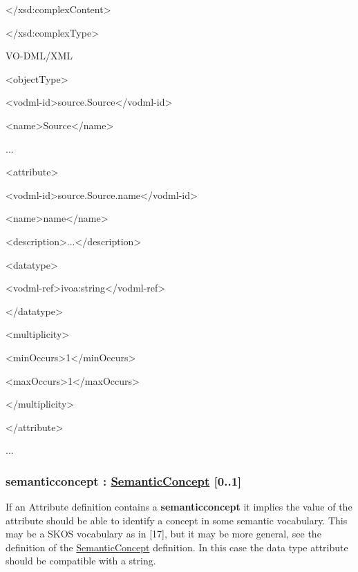 \documentclass[10pt,a4paper]{ivoa}
\begin{document}
\textless/xsd:complexContent\textgreater{}

\textless/xsd:complexType\textgreater{}

VO-DML/XML

\textless objectType\textgreater{}

\textless vodml-id\textgreater source.Source\textless/vodml-id\textgreater{}

\textless name\textgreater Source\textless/name\textgreater{}

...

\textless attribute\textgreater{}

\textless vodml-id\textgreater source.Source.name\textless/vodml-id\textgreater{}

\textless name\textgreater name\textless/name\textgreater{}

\textless description\textgreater...\textless/description\textgreater{}

\textless datatype\textgreater{}

\textless vodml-ref\textgreater ivoa:string\textless/vodml-ref\textgreater{}

\textless/datatype\textgreater{}

\textless multiplicity\textgreater{}

\textless minOccurs\textgreater1\textless/minOccurs\textgreater{}

\textless maxOccurs\textgreater1\textless/maxOccurs\textgreater{}

\textless/multiplicity\textgreater{}

\textless/attribute\textgreater{}

...

\hypertarget{semanticconcept-semanticconcept-0..1}{%
\subsubsection{\texorpdfstring{semanticconcept :
\protect\hyperlink{semanticconcept}{SemanticConcept}
{[}0..1{]}}{semanticconcept : SemanticConcept {[}0..1{]}}}\label{semanticconcept-semanticconcept-0..1}}

If an Attribute definition contains a \textbf{semanticconcept} it
implies the value of the attribute should be able to identify a concept
in some semantic vocabulary. This may be a SKOS vocabulary as in
{[}17{]}, but it may be more general, see the definition of the
\protect\hyperlink{semanticconcept}{SemanticConcept} definition. In this
case the data type attribute should be compatible with a string.
\end{document}
